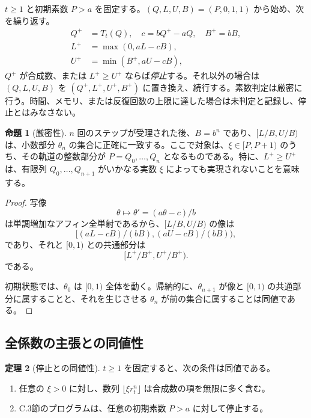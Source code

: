 \documentclass[11pt,reqno]{amsart}
\theoremstyle{definition}
\newtheorem{theorem}{定理}
\newtheorem{proposition}[theorem]{命題}
\theoremstyle{definition}
\theoremstyle{remark}
\begin{document}
\(t\ge1\) と初期素数 \(P>a\) を固定する。\((Q,L,U,B)=(P,0,1,1)\) から始め、次を繰り返す。
\[
\begin{aligned}
Q^{+}&=T_t(Q),\quad c=bQ^{+}-aQ,\quad B^{+}=bB,\\
L^{+}&=\max(0,aL-cB),\\
U^{+}&=\min(B^{+},aU-cB),
\end{aligned}
\]
\(Q^{+}\) が合成数、または \(L^{+}\ge U^{+}\) ならば\emph{停止}する。それ以外の場合は \((Q,L,U,B)\) を \((Q^{+},L^{+},U^{+},B^{+})\) に置き換え、続行する。素数判定は厳密に行う。時間、メモリ、または反復回数の上限に達した場合は未判定と記録し、停止とはみなさない。

\begin{samepage}
\begin{proposition}[厳密性]\leavevmode\label{thm:57}
\(n\) 回のステップが受理された後、\(B=b^n\) であり、\([L/B,U/B)\) は、小数部分 \(\theta_n\) の集合に正確に一致する。ここで対象は、\(\xi\in[P,P+1)\) のうち、その軌道の整数部分が \(P=Q_0,\ldots,Q_n\) となるものである。特に、\(L^{+}\ge U^{+}\) は、有限列 \(Q_0,\ldots,Q_{n+1}\) がいかなる実数 \(\xi\) によっても実現されないことを意味する。
\label{thm-end:57}
\end{proposition}
\end{samepage}

\begin{proof}\leavevmode\label{proof:57}
写像
\[
\theta\mapsto\theta'=(a\theta-c)/b
\]
は単調増加なアフィン全単射であるから、\([L/B,U/B)\) の像は
\[
[(aL-cB)/(bB),(aU-cB)/(bB)),
\]
であり、それと \([0,1)\) との共通部分は
\[
[L^{+}/B^{+},U^{+}/B^{+}).
\]
である。

初期状態では、\(\theta_0\) は \([0,1)\) 全体を動く。帰納的に、\(\theta_{n+1}\) が像と \([0,1)\) の共通部分に属することと、それを生じさせる \(\theta_n\) が前の集合に属することは同値である。\qedhere
\end{proof}

\subsection{全係数の主張との同値性}\label{sec:C.4}

\begin{samepage}
\begin{theorem}[停止との同値性]\leavevmode\label{thm:58}
\(t\ge1\) を固定すると、次の条件は同値である。

\begin{enumerate}
\def\labelenumi{(\Alph{enumi})}
\item
  任意の \(\xi>0\) に対し、数列 \(\lfloor\xi r_t^n\rfloor\) は合成数の項を無限に多く含む。
\item
  C.3節のプログラムは、任意の初期素数 \(P>a\) に対して停止する。
\end{enumerate}
\label{thm-end:58}
\end{theorem}
\end{samepage}
\end{document}
